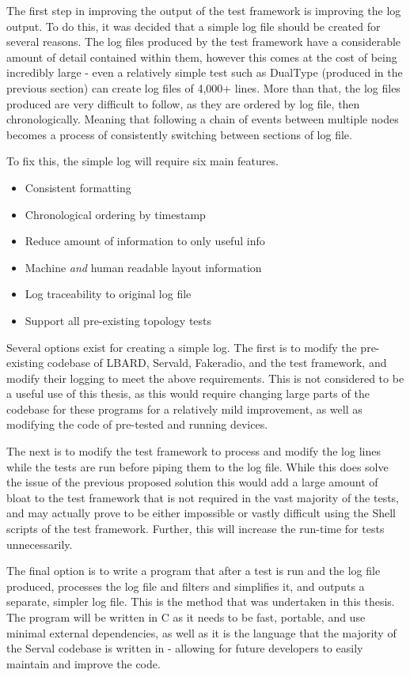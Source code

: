 The first step in improving the output of the test framework is improving the log output.
To do this, it was decided that a simple log file should be created for several reasons.
The log files produced by the test framework have a considerable amount of detail contained within them, however this comes at the cost of being incredibly large - even a relatively simple test such as DualType (produced in the previous section) can create log files of 4,000+ lines.
More than that, the log files produced are very difficult to follow, as they are ordered by log file, then chronologically.
Meaning that following a chain of events between multiple nodes becomes a process of consistently switching between sections of log file.

To fix this, the simple log will require six main features.
\begin{itemize}
    \item Consistent formatting
    \item Chronological ordering by timestamp
    \item Reduce amount of information to only useful info
    \item Machine \emph{and} human readable layout information
    \item Log traceability to original log file
    \item Support all pre-existing topology tests
\end{itemize}


Several options exist for creating a simple log.
The first is to modify the pre-existing codebase of LBARD, Servald, Fakeradio, and the test framework, and modify their logging to meet the above requirements.
This is not considered to be a useful use of this thesis, as this would require changing large parts of the codebase for these programs for a relatively mild improvement, as well as modifying the code of pre-tested and running devices.

The next is to modify the test framework to process and modify the log lines while the tests are run before piping them to the log file.
While this does solve the issue of the previous proposed solution this would add a large amount of bloat to the test framework that is not required in the vast majority of the tests, and may actually prove to be either impossible or vastly difficult using the Shell scripts of the test framework.
Further, this will increase the run-time for tests unnecessarily.

The final option is to write a program that after a test is run and the log file produced, processes the log file and filters and simplifies it, and outputs a separate, simpler log file. 
This is the method that was undertaken in this thesis. 
The program will be written in C as it needs to be fast, portable, and use minimal external dependencies, as well as it is the language that the majority of the Serval codebase is written in - allowing for future developers to easily maintain and improve the code.

